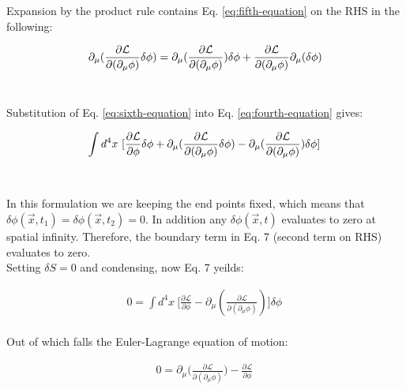 \documentclass[aps,secnumarabic,nobalancelastpage,amsmath,amssymb,
nofootinbib]{revtex4}
\newcommand{\Lagr}{\mathcal{L}}
\begin{document}
\noindent Expansion by the product rule contains Eq. \ref{eq:fifth-equation} on the RHS in the following:

\begin{equation}
 \partial_\mu (\frac{ \partial \Lagr}{ \partial (\partial_\mu \phi) }   \delta \phi) = \partial_\mu (\frac{ \partial \Lagr}{ \partial (\partial_\mu \phi) })  \delta \phi + \frac{ \partial \Lagr}{ \partial (\partial_\mu \phi) }  \partial_\mu (\delta \phi) \\\\
\label{eq:sixth-equation}
\end{equation}
\




\noindent Substitution of Eq. \ref{eq:sixth-equation} into Eq. \ref{eq:fourth-equation} gives:

\begin{equation}
\int d^4 x \ [\frac{ \partial \Lagr}{ \partial \phi} \delta \phi+\partial_\mu (\frac{ \partial \Lagr}{ \partial (\partial_\mu \phi) }   \delta \phi) - \partial_\mu (\frac{ \partial \Lagr}{ \partial (\partial_\mu \phi) })  \delta \phi]\\
\, 
\label{eq:seventh-equation}
\end{equation}

\


In this formulation we are keeping the end points fixed, which means that $\delta \phi(\vec{x},t_1)= \delta \phi(\vec{x},t_2)=0$. In addition any $\delta \phi(\vec{x},t)$ evaluates to zero at spatial infinity. Therefore, the boundary term in Eq. 7 (second term on RHS) evaluates to zero.\\



\noindent Setting $\delta S = 0$ and condensing, now Eq. 7 yeilds:

\begin{equation}
\begin{split}
0= \int d^4 x \ \bigg[\frac{ \partial \Lagr}{ \partial \phi} - \partial_\mu (\frac{ \partial \Lagr}{ \partial (\partial_\mu \phi) })\bigg]  \delta \phi 
\, \label{eq:eigth-equation}
\end{split}
\end{equation}
\\
\noindent Out of which falls the Euler-Lagrange equation of motion:
 
\begin{equation}
\begin{split}
0=  \partial_\mu \bigg(\frac{ \partial \Lagr}{ \partial (\partial_\mu \phi) }\bigg) - \frac{ \partial \Lagr}{ \partial \phi}
\, \label{eq:ninth-equation}
\end{split}
\end{equation}
\end{document}
